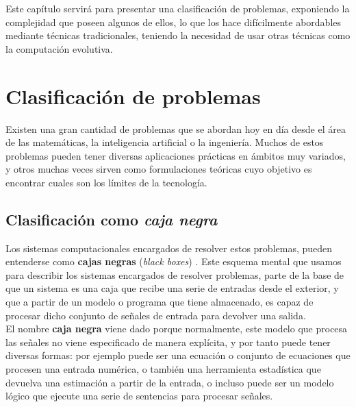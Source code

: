 
Este capítulo servirá para presentar una clasificación de problemas, exponiendo la complejidad que poseen algunos de ellos, lo que los hace difícilmente abordables mediante técnicas tradicionales, teniendo la necesidad de usar otras técnicas como la computación evolutiva.

\section{Clasificación de problemas}
\label{1:sec:1}

Existen una gran cantidad de problemas que se abordan hoy en día desde el área de las matemáticas, la inteligencia artificial o la ingeniería. Muchos de estos problemas pueden tener diversas aplicaciones prácticas en ámbitos muy variados, y otros muchas veces sirven como formulaciones teóricas cuyo objetivo es encontrar cuales son los límites de la tecnología. \\

\subsection{Clasificación como \textit{caja negra}}

Los sistemas computacionales encargados de resolver estos problemas, pueden entenderse como \textbf{cajas negras} (\textit{black boxes}) \cite{eiben2003introduction}. Este esquema mental que usamos para describir los sistemas encargados de resolver problemas, parte de la base de que un sistema es una caja que recibe una serie de entradas desde el exterior, y que a partir de un modelo o programa que tiene almacenado, es capaz de procesar dicho conjunto de señales de entrada para devolver una salida. \\

El nombre \textbf{caja negra} viene dado porque normalmente, este modelo que procesa las señales no viene especificado de manera explícita, y por tanto puede tener diversas formas: por ejemplo puede ser una ecuación o conjunto de ecuaciones que procesen una entrada numérica, o también una herramienta estadística que devuelva una estimación a partir de la entrada, o incluso puede ser un modelo lógico que ejecute una serie de sentencias para procesar señales. \\

